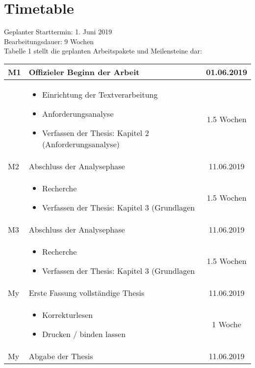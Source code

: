 \section{Timetable}
\label{sec:timetable}
\renewcommand{\arraystretch}{1.5}

Geplanter Starttermin: 1. Juni 2019 \\
Bearbeitungsdauer: 9 Wochen \\
Tabelle 1 stellt die geplanten Arbeitspakete und Meilensteine dar:
\\

	\begin{flushleft}
	    \begin{tabular}{ | l | p{10cm} | c |}
	    \hline
	    M1 & Offizieler Beginn der Arbeit & 01.06.2019 \\ 
	    \hline
	    & \begin{itemize}
            \item Einrichtung der Textverarbeitung
            \item Anforderungsanalyse
            \item Verfassen der Thesis: Kapitel 2 (Anforderungsanalyse)
	        \end{itemize} & 1.5 Wochen \\
		\hline
		M2 & Abschluss der Analysephase & 11.06.2019 \\ 
	    \hline
	    & \begin{itemize}
            \item Recherche
            \item Verfassen der Thesis: Kapitel 3 (Grundlagen
	        \end{itemize} & 1.5 Wochen \\
	    \hline
	    M3 & Abschluss der Analysephase & 11.06.2019 \\ 
	    \hline
	    & \begin{itemize}
	    	\item Recherche
	    	\item Verfassen der Thesis: Kapitel 3 (Grundlagen
	    \end{itemize} & 1.5 Wochen \\
		\hline
		My & Erste Fassung vollständige Thesis & 11.06.2019 \\ 
	    \hline
	    & \begin{itemize}
	    	\item Korrekturlesen
	    	\item Drucken / binden lassen
	    \end{itemize} & 1 Woche \\
		\hline
		My & Abgabe der Thesis & 11.06.2019 \\ 
		\hline
		\end{tabular}
	\end{flushleft}
